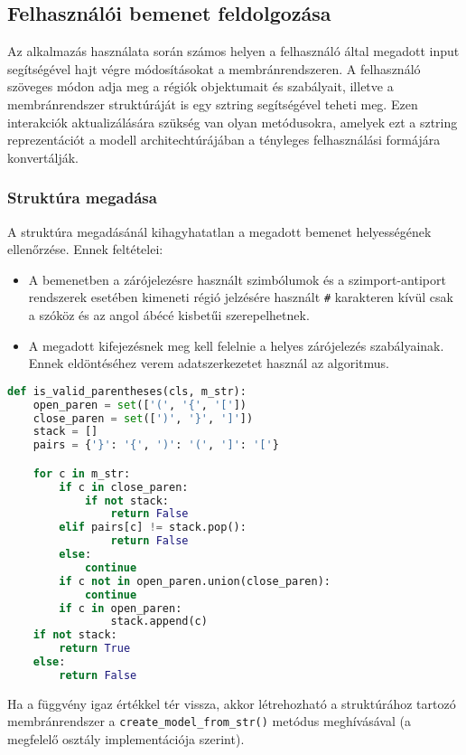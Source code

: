 \subsection{Felhasználói bemenet feldolgozása}

Az alkalmazás használata során számos helyen a felhasználó által megadott input segítségével hajt végre módosításokat a membránrendszeren. A felhasználó szöveges módon adja meg a régiók objektumait és szabályait, illetve a membránrendszer struktúráját is egy sztring segítségével teheti meg. Ezen interakciók aktualizálására szükség van olyan metódusokra, amelyek ezt a sztring reprezentációt a modell architechtúrájában a tényleges felhasználási formájára konvertálják.

\subsubsection{Struktúra megadása}
A struktúra megadásánál kihagyhatatlan a megadott bemenet helyességének ellenőrzése.
Ennek feltételei:
\begin{itemize}
\item A bemenetben a zárójelezésre használt szimbólumok és a szimport-antiport rendszerek esetében kimeneti régió jelzésére használt \verb|#| karakteren kívül csak a szóköz és az angol ábécé kisbetűi szerepelhetnek.
\item A megadott kifejezésnek meg kell felelnie a helyes zárójelezés szabályainak. Ennek eldöntéséhez verem adatszerkezetet használ az algoritmus.
\end{itemize}

\begin{lstlisting}[language={Python}]
def is_valid_parentheses(cls, m_str):
	open_paren = set(['(', '{', '['])
	close_paren = set([')', '}', ']'])
	stack = []
	pairs = {'}': '{', ')': '(', ']': '['}

	for c in m_str:
		if c in close_paren:
			if not stack:
				return False
		elif pairs[c] != stack.pop():
				return False
		else:
			continue
		if c not in open_paren.union(close_paren):
			continue
		if c in open_paren:
                stack.append(c)
	if not stack:
		return True
	else:
		return False
\end{lstlisting}

Ha a függvény igaz értékkel tér vissza, akkor létrehozható a struktúrához tartozó membránrendszer a \verb|create_model_from_str()| metódus meghívásával (a megfelelő osztály implementációja szerint). 

